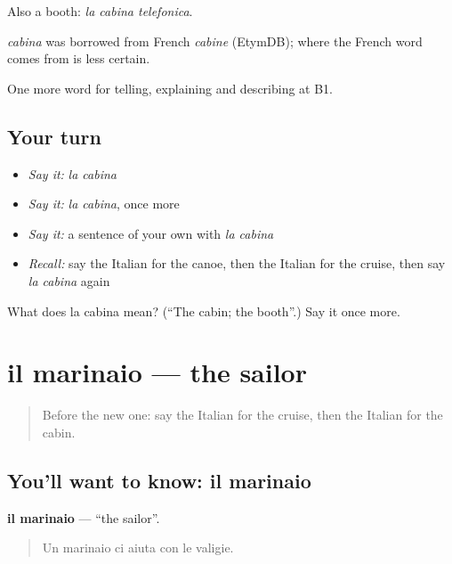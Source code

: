 Also a booth: \emph{la cabina telefonica}.

\begin{cousinweb}
\emph{cabina} was borrowed from French \emph{cabine} (EtymDB); where the French word comes from is less certain.
\end{cousinweb}

\begin{grammarlens}[title={What you've built}]
One more word for telling, explaining and describing at B1.
\end{grammarlens}

\subsection*{Your turn}
\begin{itemize}
\raggedright
  \item \emph{Say it:} \emph{la cabina}
  \item \emph{Say it:} \emph{la cabina}, once more
  \item \emph{Say it:} a sentence of your own with \emph{la cabina}
  \item \emph{Recall:} say the Italian for the canoe, then the Italian for the cruise, then say \emph{la cabina} again
\end{itemize}

\begin{tcolorbox}[breakable,colback=teal!4,colframe=teal!35!black,title={Before you move on}]
What does la cabina mean? (\textquotedblleft{}The cabin; the booth\textquotedblright{}.) Say it once more.
\end{tcolorbox}
\section[il marinaio]{il marinaio — the sailor}

\label{lesson:IT-C423-marinaio}



\begin{quote}
Before the new one: say the Italian for the cruise, then the Italian for the cabin.
\end{quote}

\subsection*{You'll want to know: il marinaio}
\textbf{il marinaio} — \textquotedblleft{}the sailor\textquotedblright{}.

\begin{quote}
Un marinaio ci aiuta con le valigie.
\end{quote}

